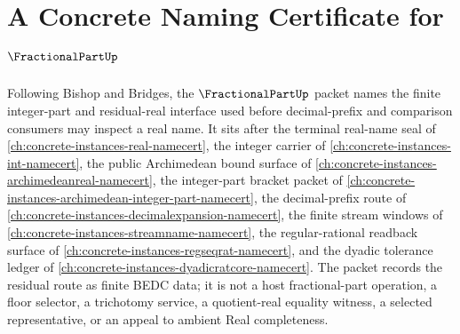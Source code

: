 \chapter{A Concrete Naming Certificate for $\FractionalPartUp$}
\label{ch:concrete-instances-fractional-part-namecert}

Following Bishop and Bridges, the $\FractionalPartUp$ packet names the finite integer-part and residual-real interface used before decimal-prefix and comparison consumers may inspect a real name. It sits after the terminal real-name seal of \autoref{ch:concrete-instances-real-namecert}, the integer carrier of \autoref{ch:concrete-instances-int-namecert}, the public Archimedean bound surface of \autoref{ch:concrete-instances-archimedeanreal-namecert}, the integer-part bracket packet of \autoref{ch:concrete-instances-archimedean-integer-part-namecert}, the decimal-prefix route of \autoref{ch:concrete-instances-decimalexpansion-namecert}, the finite stream windows of \autoref{ch:concrete-instances-streamname-namecert}, the regular-rational readback surface of \autoref{ch:concrete-instances-regseqrat-namecert}, and the dyadic tolerance ledger of \autoref{ch:concrete-instances-dyadicratcore-namecert}. The packet records the residual route as finite BEDC data; it is not a host fractional-part operation, a floor selector, a trichotomy service, a quotient-real equality witness, a selected representative, or an appeal to ambient Real completeness.

